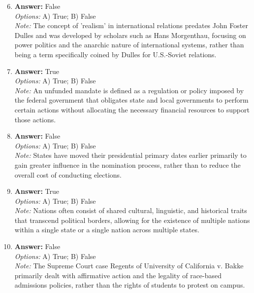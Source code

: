 \documentclass[12pt]{article}
\begin{document}
\begin{enumerate}[label=\arabic*.]
\setcounter{enumi}{5}
\item \textbf{Answer:} False
\\ \textit{Options:} A) True; B) False
\\ \textit{Note:} The concept of 'realism' in international relations predates John Foster Dulles and was developed by scholars such as Hans Morgenthau, focusing on power politics and the anarchic nature of international systems, rather than being a term specifically coined by Dulles for U.S.-Soviet relations.
\item \textbf{Answer:} True
\\ \textit{Options:} A) True; B) False
\\ \textit{Note:} An unfunded mandate is defined as a regulation or policy imposed by the federal government that obligates state and local governments to perform certain actions without allocating the necessary financial resources to support those actions.
\item \textbf{Answer:} False
\\ \textit{Options:} A) True; B) False
\\ \textit{Note:} States have moved their presidential primary dates earlier primarily to gain greater influence in the nomination process, rather than to reduce the overall cost of conducting elections.
\item \textbf{Answer:} True
\\ \textit{Options:} A) True; B) False
\\ \textit{Note:} Nations often consist of shared cultural, linguistic, and historical traits that transcend political borders, allowing for the existence of multiple nations within a single state or a single nation across multiple states.
\item \textbf{Answer:} False
\\ \textit{Options:} A) True; B) False
\\ \textit{Note:} The Supreme Court case Regents of University of California v. Bakke primarily dealt with affirmative action and the legality of race-based admissions policies, rather than the rights of students to protest on campus.
\end{enumerate}
\end{document}
